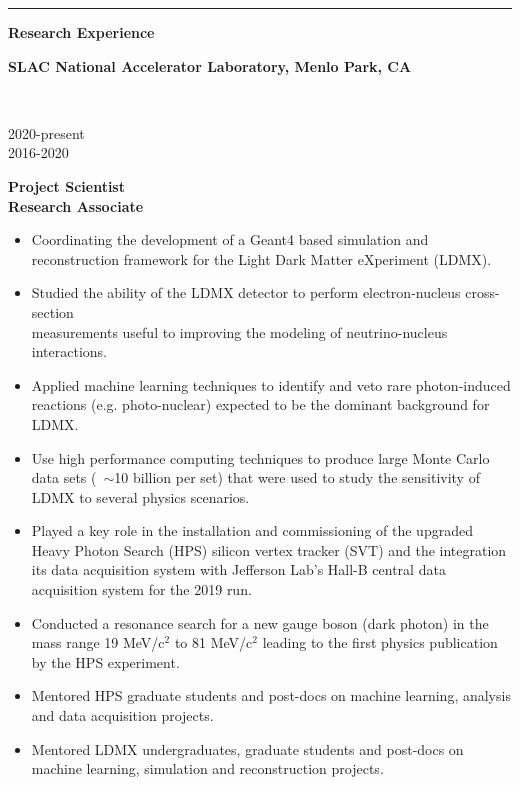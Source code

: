 \documentclass[11pt]{article}
\newcommand{\cvsection}[1] {
    \noindent
    \textcolor{indigodye}{\rule{.15\textwidth}{.1in} \hspace{0.01 \textwidth} \textbf{\Large{#1}}} \newline 
}
\newcommand{\experienceentry}[5] { 
    \noindent
    \begin{minipage}[t]{0.84\textwidth} 
      \textbf{#1, #2}
    \end{minipage} \\[0.01pt]
    \begin{minipage}[t]{0.15\textwidth} \begin{flushright} #3 \end{flushright} \end{minipage} \hspace{0.01\textwidth}
    \begin{minipage}[t]{0.84\textwidth} 
      \textbf{\textcolor{indigodye}{#4}} \vspace{5pt} %
    \end{minipage} 
    #5 \vspace{11pt}
}
\begin{document}
    \cvsection{Research Experience}
        \experienceentry{SLAC National Accelerator Laboratory}{Menlo Park, CA}
                        {2020-present \\ 2016-2020}
                        {Project Scientist \\ Research Associate}
                        {                   
            \begin{itemize}[label=\textcolor{indigodye}{$\circ$}, noitemsep, nolistsep, leftmargin=0.19\textwidth]
                \item Coordinating the development of a Geant4 based simulation and reconstruction 
                      framework for the Light Dark Matter eXperiment (LDMX).
                \item Studied the ability of the LDMX detector to perform electron-nucleus cross-section
                      \\ measurements useful to improving the modeling of neutrino-nucleus 
                      interactions.
                \item Applied machine learning techniques to identify and veto rare photon-induced reactions
                      (e.g. photo-nuclear) expected to be the dominant background for LDMX.     
                \item Use high performance computing techniques to produce large Monte Carlo data sets
                      (~$\sim$10 billion per set) that were used to study the sensitivity of LDMX 
                      to several physics scenarios.
                \item Played a key role in the installation and commissioning of the upgraded Heavy Photon Search 
                      (HPS) silicon vertex tracker (SVT) and the integration its data acquisition
                      system with Jefferson Lab's Hall-B central data acquisition system for the 2019 run.
                \item Conducted a resonance search for a new gauge boson (dark photon) in the mass range 
                      19 MeV/c$^2$ to 81 MeV/c$^2$ leading to the first physics publication by the
                      HPS experiment.
                \item Mentored HPS graduate students and post-docs on machine learning, 
                      analysis and data acquisition projects.
                \item Mentored LDMX undergraduates, graduate students and post-docs on 
                      machine learning, simulation and reconstruction projects.
            \end{itemize} 
                        } 
\end{document}
